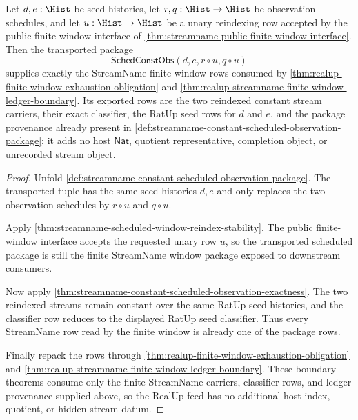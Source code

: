 \begin{theorem}
\label{thm:streamname-scheduled-window-realup-feed}
Let $d,e:\Hist$ be seed histories, let $r,q:\Hist\to\Hist$ be observation
schedules, and let $u:\Hist\to\Hist$ be a unary reindexing row accepted by the
public finite-window interface of
\autoref{thm:streamname-public-finite-window-interface}. Then the transported
package
$$
\mathsf{SchedConstObs}(d,e,r\circ u,q\circ u)
$$
supplies exactly the StreamName finite-window rows consumed by
\autoref{thm:realup-finite-window-exhaustion-obligation} and
\autoref{thm:realup-streamname-finite-window-ledger-boundary}. Its exported
rows are the two reindexed constant stream carriers, their exact classifier,
the RatUp seed rows for $d$ and $e$, and the package provenance already present
in \autoref{def:streamname-constant-scheduled-observation-package}; it adds no
host $\mathsf{Nat}$, quotient representative, completion object, or unrecorded
stream object.
\end{theorem}
\begin{proof}
Unfold \autoref{def:streamname-constant-scheduled-observation-package}. The
transported tuple has the same seed histories $d,e$ and only replaces the two
observation schedules by $r\circ u$ and $q\circ u$.

Apply \autoref{thm:streamname-scheduled-window-reindex-stability}. The public
finite-window interface accepts the requested unary row $u$, so the transported
scheduled package is still the finite StreamName window package exposed to
downstream consumers.

Now apply
\autoref{thm:streamname-constant-scheduled-observation-exactness}. The two
reindexed streams remain constant over the same RatUp seed histories, and the
classifier row reduces to the displayed RatUp seed classifier. Thus every
StreamName row read by the finite window is already one of the package rows.

Finally repack the rows through
\autoref{thm:realup-finite-window-exhaustion-obligation} and
\autoref{thm:realup-streamname-finite-window-ledger-boundary}. These boundary
theorems consume only the finite StreamName carriers, classifier rows, and
ledger provenance supplied above, so the RealUp feed has no additional host
index, quotient, or hidden stream datum.
\end{proof}

